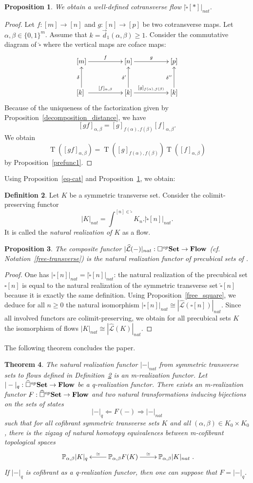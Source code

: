 \documentclass[a4paper,12pt]{amsart}
\makeatletter
\newcommand{\p}{\times}
\renewcommand{\vec}{\overrightarrow}
\newtheorem{thm}{Theorem}[section]
\newtheorem{prop}[thm]{Proposition}
\newcommand{\bp}{\begin{prop}}
\newcommand{\ep}{\end{prop}}
\newcommand{\bth}{\begin{thm}}
\renewcommand{\eth}{\end{thm}}
\newcommand{\bpf}{\begin{proof}}
\newcommand{\epf}{\end{proof}}
\theoremstyle{definition}
\newtheorem{defn}[thm]{Definition}
\newcommand{\bd}{\begin{defn}}
\newcommand{\ed}{\end{defn}}
\newcommand{\fl}[1]{\ar@{->}[l]_-{#1}}
\newcommand{\fr}[1]{\ar@{->}[r]^-{#1}}
\newcommand{\fu}[1]{\ar@{->}[u]^-{#1}}
\newcommand{\iso}{\cong}
\renewcommand{\geq}{\geqslant}
\newcommand{\brm}[1]{{\rm{\mathbf{#1}}}}
\newcommand{\dtop}{{\brm{Flow}}}
\newcommand{\set}{{\brm{Set}}}
\renewcommand{\P}{\mathbb{P}}
\newcommand{\vd}{\vec{d}\!_1}
\DeclareMathOperator{\TT}{T}
\makeatother
\begin{document}
\bp \label{incl}
	We obtain a well-defined cotransverse flow $|\widehat{\square}[*]|_{nat}$. 
\ep

\bpf
Let $f:[m]\to [n]$ and $g:[n]\to [p]$ be two cotransverse maps. Let $\alpha,\beta\in\{0,1\}^m$. Assume that $k=\vd(\alpha,\beta) \geq 1$. Consider the commutative diagram of $\widehat{\square}$ where the vertical maps are coface maps:
\[
\xymatrix@C=5em@R=3em
{
	[m] \fr{f} & [n] \fr{g} & [p]\\
	[k] \fu{\delta} \fr{[f]_{\alpha,\beta}} & [k]\fu{\delta'} \fr{[g]_{f(\alpha),f(\beta)}}& [k]\fu{\delta''}
}
\]
Because of the uniqueness of the factorization given by Proposition~\ref{decomposition_distance}, we have
\[
[gf]_{\alpha,\beta} = [g]_{f(\alpha),f(\beta)}[f]_{\alpha,\beta}.
\]
We obtain 
\[
\TT([gf]_{\alpha,\beta}) = \TT([g]_{f(\alpha),f(\beta)})\TT([f]_{\alpha,\beta})
\]
by Proposition~\ref{prefunc1}.
\epf

Using Proposition~\ref{eq-cat} and Proposition~\ref{incl}, we obtain:

\bd \label{natural-rea}
Let $K$ be a symmetric transverse set. Consider the colimit-preserving functor 
\[
|K|_{nat} = \int^{[n]\in \widehat{\square}} K_n. |\widehat{\square}[n]|_{nat}.
\]
It is called the \textit{natural realization of $K$} as a flow.
\ed

\bp \label{extend_nat}
The composite functor $|\widehat{\mathcal{L}}(-)|_{nat}:{\square}^{op}\set \to \dtop$ (cf. Notation~\ref{free-transverse}) is the natural realization functor of precubical sets of \cite[Definition~5.3]{NaturalRealization}.
\ep

\bpf
One has $|\square[n]|_{nat} = |\widehat{\square}[n]|_{nat}$: the natural realization of the precubical set $\square[n]$ is equal to the natural realization of the symmetric transverse set $\widehat{\square}[n]$ because it is exactly the same definition. Using Proposition~\ref{free_square}, we deduce for all $n\geq 0$ the natural isomorphism $|\square[n]|_{nat} \iso |\widehat{\mathcal{L}}(\square[n])|_{nat}$. Since all involved functors are colimit-preserving, we obtain for all precubical sets $K$ the isomorphism of flows $|K|_{nat} \iso |\widehat{\mathcal{L}}(K)|_{nat}$. 
\epf

The following theorem concludes the paper.

\bth \label{same-rea}
The natural realization functor $|-|_{nat}$ from symmetric transverse sets to flows defined in Definition~\ref{natural-rea} is an m-realization functor. Let $|-|_{q}:\widehat{\square}^{op}\set \to \dtop$ be a q-realization functor. There exists an m-realization functor $F:\widehat{\square}^{op}\set \to \dtop$ and two natural transformations inducing bijections on the sets of states \[|-|_q\Longleftarrow F(-)\Longrightarrow |-|_{nat}\] such that for all cofibrant symmetric transverse sets $K$ and all $(\alpha,\beta)\in K_0\p K_0$, there is the zigzag of natural homotopy equivalences between m-cofibrant topological spaces 
\[\xymatrix
{
\P_{\alpha,\beta} |K|_q & \fl{\simeq}  \P_{\alpha,\beta} F(K) \fr{\simeq} &\P_{\alpha,\beta} |K|_{nat}
}
.\] If $|-|_{q}$ is cofibrant as a q-realization functor, then one can suppose that $F= |-|_{q}$.
\eth
\end{document}
